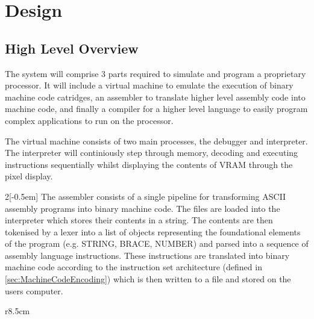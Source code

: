 \section{Design}

\subsection{High Level Overview}

The system will comprise 3 parts required to simulate and program a proprietary processor. It will include a virtual machine to emulate the execution of binary machine code catridges, an assembler to translate higher level assembly code into machine code, and finally a compiler for a higher level language to easily program complex applications to run on the processor.

The virtual machine consists of two main processes, the debugger and interpreter. The interpreter will continiously step through memory, decoding and executing instructions sequentially whilst displaying the contents of VRAM through the pixel display.

\bigskip


\bigskip

\begin{multicols}{2}[\columnsep-0.5em] 
  The assembler consists of a single pipeline for transforming ASCII assembly programs into binary machine code. The files are loaded into the interpreter which stores their contents in a string. The contents are then tokenised by a lexer into a list of objects representing the foundational elements of the program (e.g. STRING, BRACE, NUMBER) and parsed into a sequence of assembly language instructions. These instructions are translated into binary machine code according to the instruction set architecture (defined in \ref{sec:MachineCodeEncoding}) which is then written to a file and stored on the users computer.


  \columnbreak


\end{multicols}


\begin{wrapfigure}[13]{r}{8.5cm}
\end{wrapfigure}

